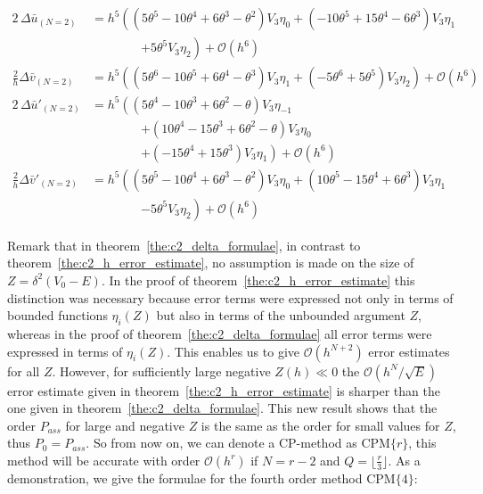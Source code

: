 \begin{align*}
    2\,\Delta \bar{u}_{(N=2)}          & = h^{5}\left(\left(5 \theta^{5} - 10 \theta^{4} + 6 \theta^{3} - \theta^{2}\right) V_{3} \eta_{0} + \left(-10 \theta^{5} + 15 \theta^{4} - 6 \theta^{3}\right) V_{3} \eta_{1} \right.    \\
                                       & \qquad\qquad \left.+5 \theta^{5} V_{3} \eta_{2}\right) + \mathcal{O}(h^{6})                                                                                                              \\
    \frac{2}{h}\Delta \bar{v}_{(N=2)}  & = h^{5}\left(\left(5 \theta^{6} - 10 \theta^{5} + 6 \theta^{4} - \theta^{3}\right) V_{3} \eta_{1} + \left(-5 \theta^{6} + 5 \theta^{5}\right) V_{3} \eta_{2}\right) + \mathcal{O}(h^{6}) \\
    2\,\Delta \bar{u}'_{(N=2)}         & = h^{5}\left(\left(5 \theta^{4} - 10 \theta^{3} + 6 \theta^{2} - \theta\right) V_{3} \eta_{-1} \right.                                                                                   \\
                                       & \qquad\qquad\left.+ \left(10 \theta^{4} - 15 \theta^{3} + 6 \theta^{2} - \theta\right) V_{3} \eta_{0} \right.                                                                            \\
                                       & \qquad\qquad \left. + \left(-15 \theta^{4} + 15 \theta^{3}\right) V_{3} \eta_{1}\right) + \mathcal{O}(h^{6})                                                                             \\
    \frac{2}{h}\Delta \bar{v}'_{(N=2)} & = h^{5}\left(\left(5 \theta^{5} - 10 \theta^{4} + 6 \theta^{3} - \theta^{2}\right) V_{3} \eta_{0} + \left(10 \theta^{5} - 15 \theta^{4} + 6 \theta^{3}\right) V_{3} \eta_{1} \right.     \\
                                       & \qquad\qquad \left. -5 \theta^{5} V_{3} \eta_{2}\right) + \mathcal{O}(h^{6})
\end{align*}

Remark that in theorem~\ref{the:c2_delta_formulae}, in contrast to theorem~\ref{the:c2_h_error_estimate}, no assumption is made on the size of $Z=\delta^2 (V_0-E)$. In the proof of theorem~\ref{the:c2_h_error_estimate} this distinction was necessary because error terms were expressed not only in terms of bounded functions $\eta_i(Z)$ but also in terms of the unbounded argument $Z$, whereas in the proof of theorem~\ref{the:c2_delta_formulae} all error terms were expressed in terms of $\eta_i(Z)$. This enables us to give $\mathcal{O}(h^{N+2})$ error estimates for all $Z$. However, for sufficiently large negative $Z(h) \ll 0$ the $\mathcal{O}({h^N}/{\sqrt{E}})$ error estimate given in theorem~\ref{the:c2_h_error_estimate} is sharper than the one given in theorem~\ref{the:c2_delta_formulae}. This new result shows that the order $P_{ass}$ for large and negative $Z$ is the same as the order for small values for $Z$, thus $P_0 = P_{ass}$. So from now on, we can denote a CP-method as $\text{CPM}\{r\}$, this method will be accurate with order $\mathcal{O}(h^r)$ if $N=r-2$ and $Q=\lfloor \frac{r}{3} \rfloor$. As a demonstration, we give the formulae for the fourth order method $\text{CPM}\{4\}$:


